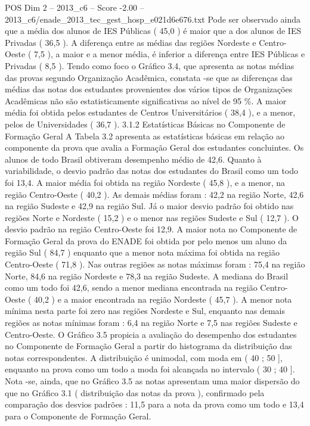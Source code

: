 \begin{textsample}{POS Dim 2 – 2013\_c6 – Score -2.00 – 2013\_c6/enade\_2013\_tec\_gest\_hosp\_e021d6e676.txt}
Pode ser observado ainda que a média dos alunos de IES Públicas ( 45,0 ) é maior que a dos alunos de IES Privadas ( 36,5 ).
A diferença entre as médias das regiões Nordeste e Centro-Oeste ( 7,5 ), a maior e a menor média, é inferior a diferença entre IES Públicas e Privadas ( 8,5 ).
Tendo como foco o Gráfico 3.4, que apresenta as notas médias das provas segundo Organização Acadêmica, constata -se que as diferenças das médias das notas dos estudantes provenientes dos vários tipos de Organizações Acadêmicas não são estatisticamente significativas ao nível de 95 \%.
A maior média foi obtida pelos estudantes de Centros Universitários ( 38,4 ), e a menor, pelos de Universidades ( 36,7 ). 3.1.2 Estatísticas Básicas no Componente de Formação Geral A Tabela 3.2 apresenta as estatísticas básicas em relação ao componente da prova que avalia a Formação Geral dos estudantes concluintes.
Os alunos de todo Brasil obtiveram desempenho médio de 42,6.
Quanto à variabilidade, o desvio padrão das notas dos estudantes do Brasil como um todo foi 13,4.
A maior média foi obtida na região Nordeste ( 45,8 ), e a menor, na região Centro-Oeste ( 40,2 ).
As demais médias foram : 42,2 na região Norte, 42,6 na região Sudeste e 42,9 na região Sul.
Já o maior desvio padrão foi obtido nas regiões Norte e Nordeste ( 15,2 ) e o menor nas regiões Sudeste e Sul ( 12,7 ).
O desvio padrão na região Centro-Oeste foi 12,9.
A maior nota no Componente de Formação Geral da prova do ENADE foi obtida por pelo menos um aluno da região Sul ( 84,7 ) enquanto que a menor nota máxima foi obtida na região Centro-Oeste ( 71,8 ).
Nas outras regiões as notas máximas foram : 75,4 na região Norte, 84,6 na região Nordeste e 78,3 na região Sudeste.
A mediana do Brasil como um todo foi 42,6, sendo a menor mediana encontrada na região Centro-Oeste ( 40,2 ) e a maior encontrada na região Nordeste ( 45,7 ).
A menor nota mínima nesta parte foi zero nas regiões Nordeste e Sul, enquanto nas demais regiões as notas mínimas foram : 6,4 na região Norte e 7,5 nas regiões Sudeste e Centro-Oeste.
O Gráfico 3.5 propicia a avaliação do desempenho dos estudantes no Componente de Formação Geral a partir do histograma da distribuição das notas correspondentes.
A distribuição é unimodal, com moda em ( 40 ; 50 ], enquanto na prova como um todo a moda foi alcançada no intervalo ( 30 ; 40 ].
Nota -se, ainda, que no Gráfico 3.5 as notas apresentam uma maior dispersão do que no Gráfico 3.1 ( distribuição das notas da prova ), confirmado pela comparação dos desvios padrões : 11,5 para a nota da prova como um todo e 13,4 para o Componente de Formação Geral.

\end{textsample}
